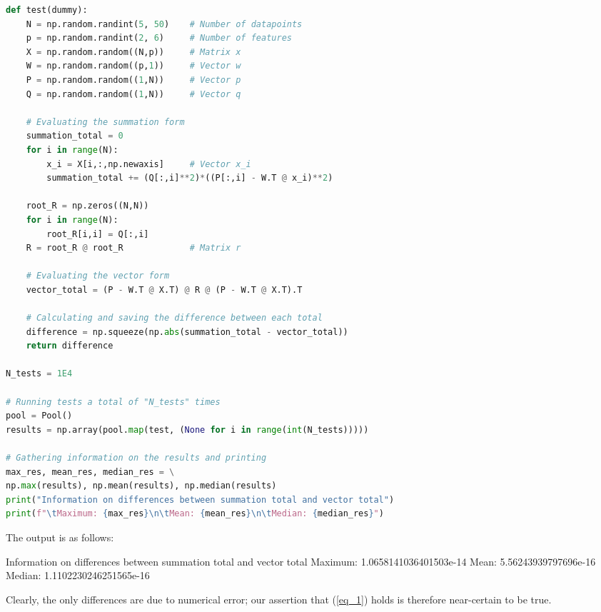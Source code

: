 \documentclass[a4paper,10pt,english]{article}
\begin{document}
\begin{multicols*}{2}
\begin{lstlisting}[showstringspaces=false,language=Python,numbers=none]
def test(dummy):
    N = np.random.randint(5, 50)    # Number of datapoints
    p = np.random.randint(2, 6)     # Number of features
    X = np.random.random((N,p))     # Matrix x
    W = np.random.random((p,1))     # Vector w
    P = np.random.random((1,N))     # Vector p
    Q = np.random.random((1,N))     # Vector q

    # Evaluating the summation form
    summation_total = 0
    for i in range(N):
        x_i = X[i,:,np.newaxis]     # Vector x_i
        summation_total += (Q[:,i]**2)*((P[:,i] - W.T @ x_i)**2)

    root_R = np.zeros((N,N))
    for i in range(N):
        root_R[i,i] = Q[:,i]
    R = root_R @ root_R             # Matrix r

    # Evaluating the vector form
    vector_total = (P - W.T @ X.T) @ R @ (P - W.T @ X.T).T

    # Calculating and saving the difference between each total
    difference = np.squeeze(np.abs(summation_total - vector_total))
    return difference

N_tests = 1E4

# Running tests a total of "N_tests" times
pool = Pool()
results = np.array(pool.map(test, (None for i in range(int(N_tests)))))

# Gathering information on the results and printing
max_res, mean_res, median_res = \
np.max(results), np.mean(results), np.median(results)
print("Information on differences between summation total and vector total")
print(f"\tMaximum: {max_res}\n\tMean: {mean_res}\n\tMedian: {median_res}")
\end{lstlisting}

The output is as follows:

\begin{terminal}

Information on differences between summation total and vector total
	Maximum: 1.0658141036401503e-14
	Mean: 5.56243939797696e-16
	Median: 1.1102230246251565e-16
\end{terminal}

Clearly, the only differences are due to numerical error; our assertion that (\ref{eq_1}) holds is therefore near-certain to be true.

\end{multicols*}
\end{document}
